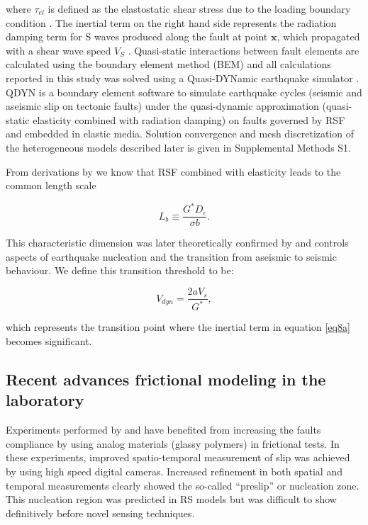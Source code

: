 \documentclass[preprint,1p, 10pt,authoryear]{elsarticle}
\begin{document}
\noindent where $\tau_{el}$ is defined as the elastostatic shear stress due to the loading boundary condition \citep{Horowitz1989}. The inertial term on the right hand side represents the radiation damping term for S waves produced along the fault at point $\mathbf{x}$, which propagated with a shear wave speed $V_{S}$ \citep{Rice1993}. Quasi-static interactions between fault elements are calculated using the boundary element method (BEM) and all calculations reported in this study was solved using a Quasi-DYNamic earthquake simulator \citep{Luo2017}. QDYN is a boundary element software to simulate earthquake cycles (seismic and aseismic slip on tectonic faults) under the quasi-dynamic approximation (quasi-static elasticity combined with radiation damping) on faults governed by RSF and embedded in elastic media.  Solution convergence and mesh discretization of the heterogeneous models described later is given in Supplemental Methods S1.

From derivations by \citet{Dieterich1992} we know that RSF combined with elasticity leads to the common length scale

\begin{equation}
\label{eq8b}
L_{b} \equiv \frac{G^{*}D_{c}}{\sigma b}.
\end{equation}  

\noindent This characteristic dimension was later theoretically confirmed by \citet{Rubin2005} and controls aspects of earthquake nucleation and the transition from aseismic to seismic behaviour. We define this transition threshold to be:

\begin{equation}
\label{eq8c}
V_{dyn} = \frac{2 a V_{s}}{G^{*}},
\end{equation}  

\noindent which represents the transition point where the inertial term in equation \eqref{eq8a} becomes significant. 

\subsection{Recent advances frictional modeling in the laboratory}
\label{advances RSF}
Experiments performed by \citet{Nielsen2010} and \citet{Latour2013} have benefited from increasing the faults compliance by using analog materials (glassy polymers) in frictional tests. In these experiments, improved spatio-temporal measurement of slip was achieved by using high speed digital cameras. Increased refinement in both spatial and temporal measurements clearly showed the so-called ``preslip'' or nucleation zone.  This nucleation region was predicted in RS models \citep{Dieterich1992, Rubin2005, Ampuero2008} but was difficult to show definitively before novel sensing techniques.
\end{document}
